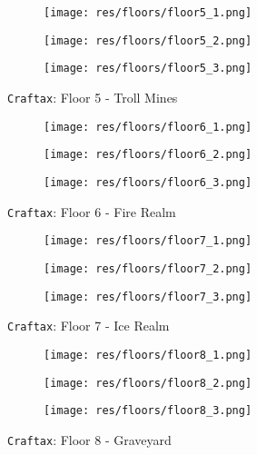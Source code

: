 \documentclass{article}
\theoremstyle{plain}
\theoremstyle{definition}
\theoremstyle{remark}
\begin{document}
\begin{figure*}
    \centering
    \begin{subfigure}{0.28\linewidth}
        \texttt{[image: res/floors/floor5\_1.png]}
    \end{subfigure}\hfill%
    \begin{subfigure}{0.28\linewidth}
        \texttt{[image: res/floors/floor5\_2.png]}
    \end{subfigure}\hfill%
    \begin{subfigure}{0.28\linewidth}
        \texttt{[image: res/floors/floor5\_3.png]}
    \end{subfigure}\hfill%
    \caption{\texttt{Craftax}: Floor 5 - Troll Mines}
    \label{fig:app_craftax_classic_level_5}

    
    \centering
    \begin{subfigure}{0.28\linewidth}
        \texttt{[image: res/floors/floor6\_1.png]}
    \end{subfigure}\hfill%
    \begin{subfigure}{0.28\linewidth}
        \texttt{[image: res/floors/floor6\_2.png]}
    \end{subfigure}\hfill%
    \begin{subfigure}{0.28\linewidth}
        \texttt{[image: res/floors/floor6\_3.png]}
    \end{subfigure}\hfill%
    \caption{\texttt{Craftax}: Floor 6 - Fire Realm}
    \label{fig:app_craftax_classic_level_6}

    
    \centering
    \begin{subfigure}{0.28\linewidth}
        \texttt{[image: res/floors/floor7\_1.png]}
    \end{subfigure}\hfill%
    \begin{subfigure}{0.28\linewidth}
        \texttt{[image: res/floors/floor7\_2.png]}
    \end{subfigure}\hfill%
    \begin{subfigure}{0.28\linewidth}
        \texttt{[image: res/floors/floor7\_3.png]}
    \end{subfigure}\hfill%
    \caption{\texttt{Craftax}: Floor 7 - Ice Realm}
    \label{fig:app_craftax_classic_level_7}

    \centering
    \begin{subfigure}{0.28\linewidth}
        \texttt{[image: res/floors/floor8\_1.png]}
    \end{subfigure}\hfill%
    \begin{subfigure}{0.28\linewidth}
        \texttt{[image: res/floors/floor8\_2.png]}
    \end{subfigure}\hfill%
    \begin{subfigure}{0.28\linewidth}
        \texttt{[image: res/floors/floor8\_3.png]}
    \end{subfigure}\hfill%
    \caption{\texttt{Craftax}: Floor 8 - Graveyard}
    \label{fig:app_craftax_classic_level_8}

\end{figure*}
\end{document}

